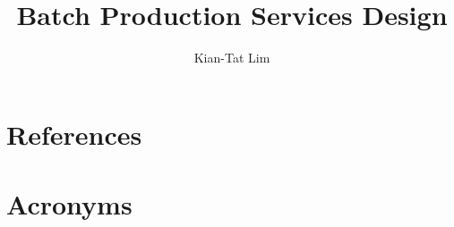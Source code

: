 \documentclass[DM,authoryear,toc]{lsstdoc}
\title{Batch Production Services Design}
\author{%
Kian-Tat Lim
}
\date{\vcsDate}
\begin{document}
\maketitle


\appendix
\section{References} \label{sec:bib}


\section{Acronyms} \label{sec:acronyms}

\end{document}
